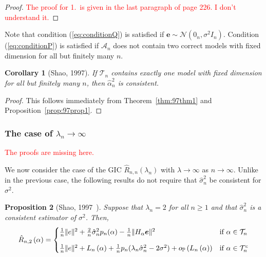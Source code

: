 \documentclass[12pt, letter paper]{article}
\newcommand{\1}{\mathmybb{1}}
\newtheorem{proposition}{Proposition}[section]
\newtheorem{corollary}[proposition]{Corollary}
\newcommand{\0}{\emptyset}
\newcommand{\prob}{\mathbb{P}}
\newcommand{\paren}[1]{\left(#1 \right)}
\newcommand{\norm}[1]{|\hspace{-1pt}|#1 |\hspace{-1pt}|}
\newcommand{\normsq}[1]{\norm{#1}^{2}}
\newcommand{\Acal}{\mathcal{A}_{n}}
\newcommand{\Tcal}{\mathcal{T}_{n}}
\newcommand{\Ncal}{\mathcal{N}}
\newcommand{\e}{\boldsymbol{e}}
\newcommand{\Loss}[1]{L_{n}\paren{#1}}
\newcommand{\Rhat}[2]{\hat{R}_{n, #1}\paren{#2}}
\newcommand{\alphahat}[1]{\hat{\alpha}^{#1}}
\newcommand{\op}[1]{o_{\prob}\paren{#1}}
\newcommand{\sigmahat}{\hat{\sigma}^{2}_{n}}
\begin{document}
\begin{proof}
    \textcolor{red}{The proof for 1.\ is given in the last paragraph of page 226. I don't understand it.}
\end{proof}

Note that condition (\ref{eq:conditionQ}) is satisfied if \(\e\sim\Ncal(0_{n}, \sigma^{2}I_{n})\). Condition (\ref{eq:conditionP}) is satisfied if \(\Acal\) does not contain two correct models with fixed dimension for all but finitely many \(n\).
\begin{corollary}[Shao, 1997]
    If \(\Tcal\) contains exactly one model with fixed dimension for all but finitely many \(n\), then \(\alphahat{2}_{n}\) is consistent.
\end{corollary}

\begin{proof}
    This follows immediately from Theorem~\ref{thm:97thm1} and Proposition~\ref{prop:97prop1}.
\end{proof}

\subsubsection{The case of \(\lambda_{n} \to \infty\)}

\textcolor{red}{The proofs are missing here.}

We now consider the case of the GIC \(\Rhat{n}{\lambda_{n}}\) with \(\lambda\to\infty\) as \(n\to \infty\). Unlike in the previous case, the following results do not require that \(\sigmahat\) be consistent for \(\sigma^{2}\).

\begin{proposition}[Shao, 1997~\cite{shao_1997}]\label{prop:97decomp2}
    Suppose that \(\lambda_{n}=2\) for all \(n\geq 1\) and that \(\sigmahat\) is a consistent estimator of \(\sigma^{2}\). Then,
    \[\Rhat{2}{\alpha} = \begin{cases}
        \frac{1}{n}\normsq{e} + \frac{2}{n}\sigmahat p_{n}(\alpha) - \frac{1}{n}\normsq{H_{\alpha}\e} &\text{if }\alpha\in\Tcal\\[3mm]
        \frac{1}{n}\normsq{e} + \Loss{\alpha} + \frac{1}{n}p_{n}(\lambda_{n}\sigmahat - 2\sigma^{2}) + \op{\Loss{\alpha}} &\text{if }\alpha\in\Tcal^{c}
    \end{cases}\]
\end{proposition}
\end{document}
